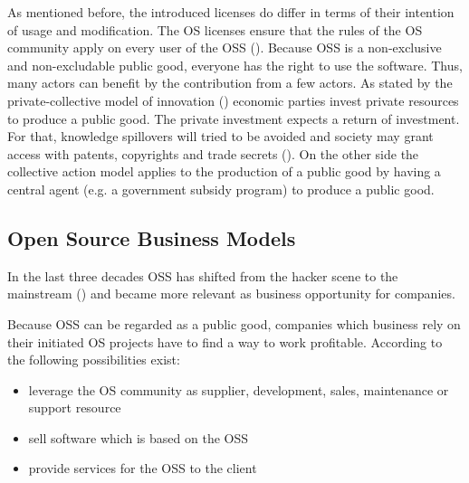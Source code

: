As mentioned before, the introduced licenses do differ in terms of their intention of usage and modification. The OS licenses ensure that the rules of the OS community apply on every user of the OSS (\cite{eilhard2010tapping}). Because OSS is a non-exclusive and non-excludable public good, everyone has the right to use the software. Thus, many actors can benefit by the contribution from a few actors. As stated by the private-collective model of innovation (\cite{hippel2003open}) economic parties invest private resources to produce a public good. The private investment expects a return of investment. For that, knowledge spillovers will tried to be avoided and society may grant access with patents, copyrights and trade secrets (\cite{osterloh2007open}). On the other side the collective action model applies to the production of a public good by having a central agent (e.g. a government subsidy program) to produce a public good.

\subsection{Open Source Business Models}

In the last three decades OSS has shifted from the hacker scene to the mainstream (\cite{fitzgerald2006transformation}) and became more relevant as business opportunity for companies.

Because OSS can be regarded as a public good, companies which business rely on their initiated OS projects have to find a way to work profitable. According to \cite{popp2010profit} the following possibilities exist:

\begin{itemize}
  \item leverage the OS community as supplier, development, sales, maintenance or support resource
  \item sell software which is based on the OSS
  \item provide services for the OSS to the client
\end{itemize}

